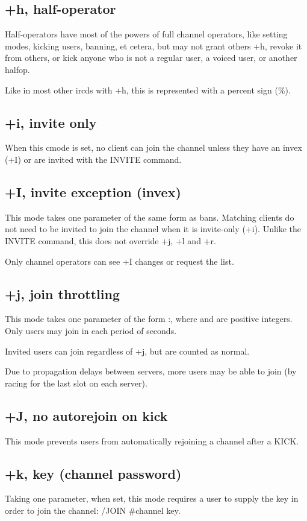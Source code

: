\subsection{+h, half-operator}
	Half-operators have most of the powers of full channel operators, like
	setting modes, kicking users, banning, et cetera, but may not grant others
	+h, revoke it from others, or kick anyone who is not a regular user, a
	voiced user, or another halfop.

	Like in most other ircds with +h, this is represented with a percent sign (\%).

\subsection{+i, invite only}
	When this cmode is set, no client can join the channel unless they have
	an invex (+I) or are invited with the INVITE command.

\subsection{+I, invite exception (invex)}
	This mode takes one parameter of the same form as bans. Matching
	clients do not need to be invited to join the channel when it is
	invite-{}only (+i). Unlike the INVITE command, this does not override
	+j, +l and +r.

	Only channel operators can see +I changes or request the list.

\subsection{+j, join throttling}
	This mode takes one parameter of the form
	:, where  and
	 are positive integers. Only  users may
	join in each period of  seconds.

	Invited users can join regardless of +j, but are counted as normal.

	Due to propagation delays between servers, more users may be
	able to join (by racing for the last slot on each server).

\subsection{+J, no autorejoin on kick}
	This mode prevents users from automatically rejoining a channel after a
	KICK.

\subsection{+k, key (channel password)}
	Taking one parameter, when set, this mode requires a user to supply the
	key in order to join the channel: /JOIN \#channel key.


